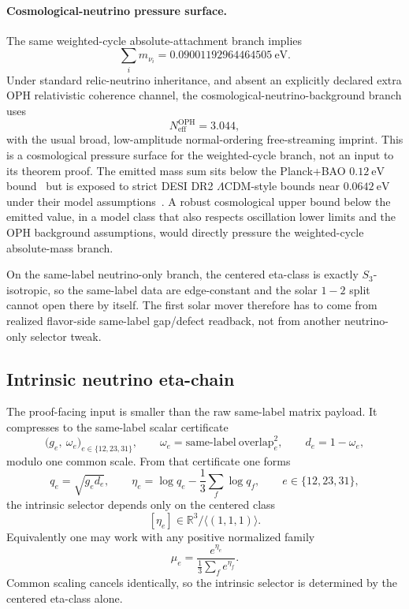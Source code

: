 \documentclass[11pt]{article}
\begin{document}
\paragraph{Cosmological-neutrino pressure surface.}
The same weighted-cycle absolute-attachment branch implies
\[
\sum_i m_{\nu_i}
=
0.09001192964464505~\mathrm{eV}.
\]
Under standard relic-neutrino inheritance, and absent an explicitly declared extra OPH relativistic
coherence channel, the cosmological-neutrino-background branch uses
\[
N_{\mathrm{eff}}^{\mathrm{OPH}}=3.044,
\]
with the usual broad, low-amplitude normal-ordering free-streaming imprint. This is a
cosmological pressure surface for the weighted-cycle branch, not an input to its theorem proof.
The emitted mass sum sits below the Planck+BAO \(0.12~\mathrm{eV}\) bound~\cite{planck18} but is
exposed to strict DESI DR2 \(\Lambda\)CDM-style bounds near \(0.0642~\mathrm{eV}\) under their
model assumptions~\cite{desidr2nu}. A robust cosmological upper bound below the emitted value,
in a model class that also respects oscillation lower limits and the OPH background assumptions,
would directly pressure the weighted-cycle absolute-mass branch.

On the same-label neutrino-only branch, the centered eta-class is exactly \(S_3\)-isotropic, so
the same-label data are edge-constant and the solar \(1\!-\!2\) split cannot open there by itself.
The first solar mover therefore has to come from realized flavor-side same-label gap/defect
readback, not from another neutrino-only selector tweak.

\subsection{Intrinsic neutrino eta-chain}

The proof-facing input is smaller than the raw same-label matrix payload. It compresses to the
same-label scalar certificate
\[
\bigl(g_e,\ \omega_e\bigr)_{e\in\{12,23,31\}},
\qquad
\omega_e=\mathrm{same\text{-}label\ overlap}_e^2,
\qquad
d_e=1-\omega_e,
\]
modulo one common scale. From that certificate one forms
\[
q_e=\sqrt{g_e d_e},
\qquad
\eta_e=\log q_e-\frac13\sum_f \log q_f,
\qquad
e\in\{12,23,31\},
\]
the intrinsic selector depends only on the centered class
\[
[\eta_e]\in \mathbb{R}^3/\langle(1,1,1)\rangle.
\]
Equivalently one may work with any positive normalized family
\[
\mu_e=\frac{e^{\eta_e}}{\frac13\sum_f e^{\eta_f}}.
\]
Common scaling cancels identically, so the intrinsic selector is determined by the centered
eta-class alone.
\end{document}

